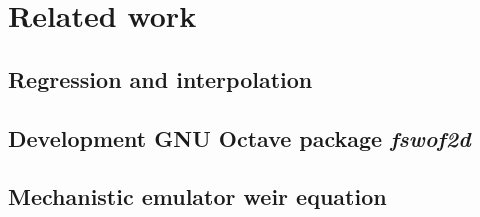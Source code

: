 \chapter{Related work}
\label{chp:related_work}

\section{Regression and interpolation}

\section{Development GNU Octave package \textit{fswof2d}}

\section{Mechanistic emulator weir equation}
